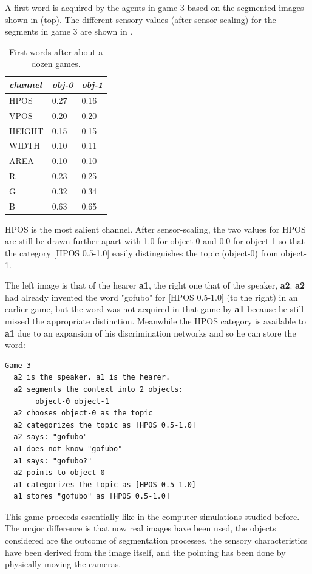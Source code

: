 A first word is acquired by the agents in game 3 
based on the segmented images shown in  (top).
The different sensory values (after sensor-scaling)
for the segments in game 3 are shown in . 
\begin{table}
\begin{center}
\begin{tabular}{ l  l  l } \midrule
{\it channel}& {\it obj-0} & {\it obj-1}\\ \midrule
HPOS & 0.27 & 0.16\\ \midrule
VPOS & 0.20 & 0.20\\ \midrule
HEIGHT & 0.15 & 0.15\\ \midrule
WIDTH & 0.10 & 0.11\\ \midrule
AREA & 0.10 & 0.10\\ \midrule
R & 0.23 & 0.25\\ \midrule
G & 0.32 & 0.34\\ \midrule
B & 0.63 & 0.65\\ \midrule
\end{tabular}
\caption{ \label{tab:game3b} First words after about a dozen games.}
\end{center}
\end{table}
HPOS is the most salient channel. After sensor-scaling, 
the two values for HPOS are still be drawn further
apart with 1.0 for object-0 and 
0.0 for object-1 so that the category [HPOS 0.5-1.0] easily 
distinguishes the topic (object-0) from object-1.

The left image is that of the hearer {\bf a1}, the right one
that of the speaker, {\bf a2}.
{\bf a2} had already invented the word "gofubo" for 
[HPOS 0.5-1.0] (to the right) in an earlier game, 
but the word was not acquired in that game
by {\bf a1} because he still missed the 
appropriate distinction. Meanwhile the HPOS category 
is available to {\bf a1} due to an
expansion of his discrimination networks
and so he can store the word: 
\begin{verbatim}
Game 3 
  a2 is the speaker. a1 is the hearer. 
  a2 segments the context into 2 objects: 
       object-0 object-1
  a2 chooses object-0 as the topic 
  a2 categorizes the topic as [HPOS 0.5-1.0]
  a2 says: "gofubo"
  a1 does not know "gofubo"
  a1 says: "gofubo?"
  a2 points to object-0
  a1 categorizes the topic as [HPOS 0.5-1.0]
  a1 stores "gofubo" as [HPOS 0.5-1.0]
\end{verbatim}
This game proceeds essentially like in the computer
simulations studied before. The major difference is
that now real images have been used, the objects
considered are the outcome of segmentation processes,
the sensory characteristics have been derived from the 
image itself, and the pointing has been done by 
physically moving the cameras. 

